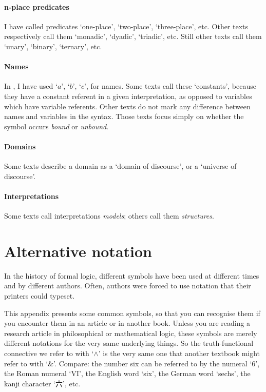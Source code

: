 \paragraph{n-place predicates} I have called predicates `one-place', `two-place', `three-place', etc. Other texts respectively call them `monadic', `dyadic', `triadic', etc. Still other texts call them `unary', `binary', `ternary', etc.

\paragraph{Names} In \FOL, I have used `$a$', `$b$', `$c$', for names. Some texts call these `constants', because they have a constant referent in a given interpretation, as opposed to variables which have variable referents. Other texts do not mark any difference between names and variables in the syntax. Those texts focus simply on  whether the symbol occurs \emph{bound} or \emph{unbound}. 

\paragraph{Domains} Some texts describe a domain as a `domain of discourse', or a `universe of discourse'.

\paragraph{Interpretations} Some texts call interpretations \emph{models}; others call them \emph{structures}.

\section*{Alternative notation}
In the history of formal logic, different symbols have been used at different times and by different authors. Often, authors were forced to use notation that their printers could typeset.

This appendix presents some common symbols, so that you can recognise them if you encounter them in an article or in another book. Unless you are reading a research article in philosophical or mathematical logic, these symbols are merely different notations for the very same underlying things. So the truth-functional connective we refer to with `$\wedge$' is the very same one that another textbook might refer to with `$\&$'. Compare: the number six can be referred to by the numeral `$6$', the Roman numeral `VI', the English word `six', the German word `sechs', the kanji character `{\cjkfont 六}', etc.


